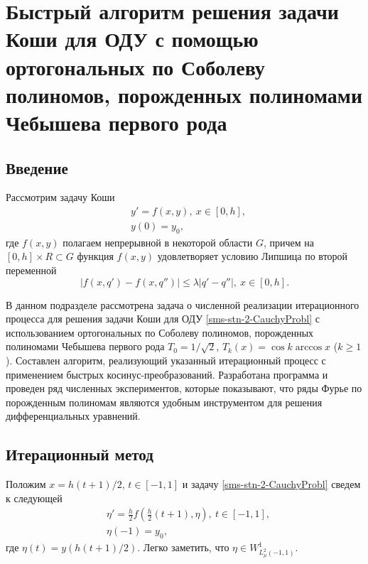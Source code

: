 \section{Быстрый алгоритм решения задачи Коши для ОДУ с помощью ортогональных по Соболеву полиномов, порожденных полиномами Чебышева первого рода}



\subsection{Введение}

Рассмотрим задачу Коши
\begin{equation}\label{sms-stn-2-CauchyProbl}
\begin{aligned}
&y'=f(x,y),\ x\in[0,h],\\
&y(0)=y_0,
\end{aligned}
\end{equation}
где $f(x,y)$ полагаем непрерывной в некоторой области $G$, причем на $[0,h]\times R\subset G$ функция $f(x,y)$ удовлетворяет условию Липшица по второй переменной
\begin{equation}\label{sms-stn-2-LipSecVar}
|f(x,q')-f(x,q'')|\le\lambda|q'-q''|,\ x\in[0,h].
\end{equation}

В данном подразделе рассмотрена задача о численной реализации итерационного процесса для решения задачи Коши для ОДУ \eqref{sms-stn-2-CauchyProbl} с использованием ортогональных по Соболеву полиномов, порожденных полиномами Чебышева первого рода $T_0=1/\sqrt{2}$, $T_k(x)=\cos k\arccos x$ ($k\ge1$). Составлен алгоритм, реализующий указанный итерационный процесс с применением быстрых косинус-преобразова\-ний. Разработана программа и проведен ряд численных экспериментов, которые показывают, что ряды Фурье по порожденным полиномам являются удобным инструментом для решения дифференциальных уравнений.

\subsection{Итерационный метод}

Положим $x=h(t+1)/2$, $t\in[-1,1]$ и задачу \eqref{sms-stn-2-CauchyProbl} сведем к следующей
\begin{equation}\label{sms-stn-2-CauchyProblEta}
\begin{aligned}
&\eta'=\frac h2f\left(\frac h2(t+1),\eta\right),\ t\in[-1,1],\\
&\eta(-1)=y_0,
\end{aligned}
\end{equation}
где $\eta(t)= y(h(t+1)/2)$. Легко заметить, что $\eta\in W^1_{L^2_\mu(-1,1)}$.

